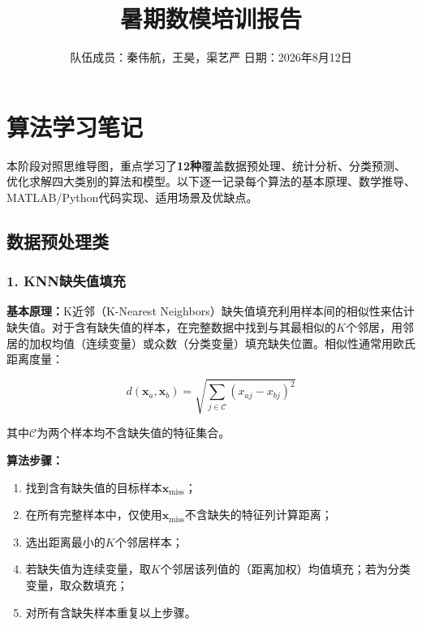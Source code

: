 \documentclass[12pt,a4paper]{ctexart}
\title{\vspace{-2cm}\textbf{暑期数模培训报告}}
\author{队伍成员：秦伟航，王昊，渠艺严 \quad 日期：2026年8月12日}
\date{}
\begin{document}
\maketitle
\thispagestyle{fancy}

\section{算法学习笔记}

本阶段对照思维导图，重点学习了\textbf{12种}覆盖数据预处理、统计分析、分类预测、优化求解四大类别的算法和模型。以下逐一记录每个算法的基本原理、数学推导、MATLAB/Python代码实现、适用场景及优缺点。

\subsection{数据预处理类}

\subsubsection{1. KNN缺失值填充}

\textbf{基本原理：}K近邻（K-Nearest Neighbors）缺失值填充利用样本间的相似性来估计缺失值。对于含有缺失值的样本，在完整数据中找到与其最相似的$K$个邻居，用邻居的加权均值（连续变量）或众数（分类变量）填充缺失位置。相似性通常用欧氏距离度量：

\begin{equation}
d(\mathbf{x}_a, \mathbf{x}_b) = \sqrt{\sum_{j \in \mathcal{C}} (x_{aj} - x_{bj})^2}
\end{equation}

其中$\mathcal{C}$为两个样本均不含缺失值的特征集合。

\textbf{算法步骤：}
\begin{enumerate}[label=(\arabic*), leftmargin=*]
    \item 找到含有缺失值的目标样本$\mathbf{x}_{\text{miss}}$；
    \item 在所有完整样本中，仅使用$\mathbf{x}_{\text{miss}}$不含缺失的特征列计算距离；
    \item 选出距离最小的$K$个邻居样本；
    \item 若缺失值为连续变量，取$K$个邻居该列值的（距离加权）均值填充；若为分类变量，取众数填充；
    \item 对所有含缺失样本重复以上步骤。
\end{enumerate}
\end{document}
